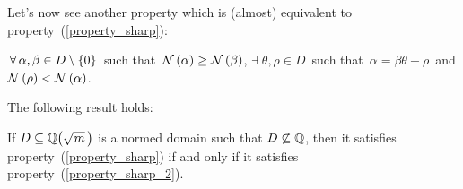 Let's now see another property which is (almost)
equivalent to property~(\ref{property_sharp}):

\begin{property}\label{property_sharp_2}
$\,\forall\, \alpha, \beta \in D\setminus\left\{0\right\}$\,
such that\, $\mathcal{N}\left(\alpha\right) \geq \mathcal{N}\left(\beta\right)$,\:
$\exists\; \theta,\rho \in D$\, such that\,
$\alpha = \beta\theta + \rho$\, and\,
$\mathcal{N}\left(\rho\right) < \mathcal{N}\left(\alpha\right)$.
\end{property}


The following result holds:
\begin{thm}\label{sharp2_almost_equivalent_sharp}
If $D \subseteq \QQ{m}$ is a normed
domain such that $D \not\subseteq \mathbb{Q}$, then it satisfies
property~(\ref{property_sharp}) if and only if it
satisfies property~(\ref{property_sharp_2}).
\end{thm}

